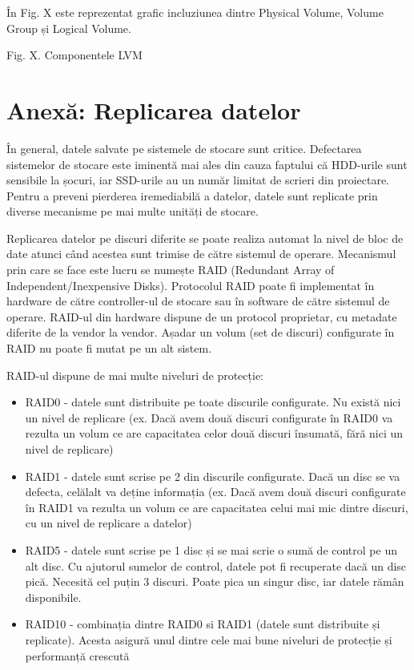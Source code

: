 În Fig. X este reprezentat grafic incluziunea dintre Physical Volume, Volume
Group și Logical Volume.

Fig. X. Componentele LVM

\section{Anexă: Replicarea datelor}
\label{sec:storage-replicare}

În general, datele salvate pe sistemele de stocare sunt critice. Defectarea
sistemelor de stocare este iminentă mai ales din cauza faptului că HDD-urile
sunt sensibile la șocuri, iar SSD-urile au un număr limitat de scrieri din
proiectare. Pentru a preveni pierderea iremediabilă a datelor, datele sunt
replicate prin diverse mecanisme pe mai multe unități de stocare.

Replicarea datelor pe discuri diferite se poate realiza automat la nivel de bloc
de date atunci când acestea sunt trimise de către sistemul de operare.
Mecanismul prin care se face este lucru se numește RAID (Redundant Array of
Independent/Inexpensive Disks). Protocolul RAID poate fi implementat în hardware
de către controller-ul de stocare sau în software de către sistemul de operare.
RAID-ul din hardware dispune de un protocol proprietar, cu metadate diferite de
la vendor la vendor. Așadar un volum (set de discuri) configurate în RAID nu
poate fi mutat pe un alt sistem.

RAID-ul dispune de mai multe niveluri de protecție:

\begin{itemize}
	\item RAID0 - datele sunt distribuite pe toate discurile configurate. Nu
		există nici un nivel de replicare (ex. Dacă avem două discuri
		configurate în RAID0 va rezulta un volum ce are capacitatea
		celor două discuri însumată, fără nici un nivel de replicare)
	\item RAID1 - datele sunt scrise pe 2 din discurile configurate. Dacă un
		disc se va defecta, celălalt va deține informația (ex. Dacă avem
		două discuri configurate în RAID1 va rezulta un volum ce are
		capacitatea celui mai mic dintre discuri, cu un nivel de
		replicare a datelor)
	\item RAID5 - datele sunt scrise pe 1 disc și se mai scrie o sumă de
		control pe un alt disc. Cu ajutorul sumelor de control, datele
		pot fi recuperate dacă un disc pică. Necesită cel puțin 3
		discuri. Poate pica un singur disc, iar datele rămân
		disponibile.
	\item RAID10 - combinația dintre RAID0 si RAID1 (datele sunt distribuite
		și replicate). Acesta asigură unul dintre cele mai bune niveluri
		de protecție și performanță crescută
\end{itemize}

